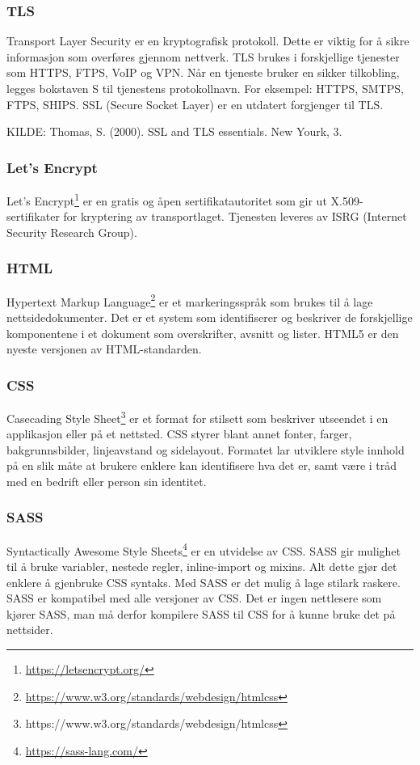 \subsubsection{TLS}
Transport Layer Security er en kryptografisk protokoll. Dette er viktig for å sikre informasjon som overføres gjennom nettverk. TLS brukes i forskjellige tjenester som HTTPS, FTPS, VoIP og VPN.
Når en tjeneste bruker en sikker tilkobling, legges bokstaven S til tjenestens protokollnavn. For eksempel: HTTPS, SMTPS, FTPS, SHIPS.
SSL (Secure Socket Layer) er en utdatert forgjenger til TLS.

KILDE: Thomas, S. (2000). SSL and TLS essentials. New Yourk, 3.

\subsubsection{Let’s Encrypt}
Let’s Encrypt\footnote{\url{https://letsencrypt.org/}} er en gratis og åpen sertifikatautoritet som gir ut X.509-sertifikater for kryptering av transportlaget. Tjenesten leveres av ISRG (Internet Security Research Group).

\subsubsection{HTML}
Hypertext Markup Language\footnote{\url{https://www.w3.org/standards/webdesign/htmlcss}} er et markeringsspråk som brukes til å lage nettsidedokumenter. Det er et system som identifiserer og beskriver de forskjellige komponentene i et dokument som overskrifter, avsnitt og lister. HTML5 er den nyeste versjonen av HTML-standarden.

\subsubsection{CSS}
Casecading Style Sheet\footnote{https://www.w3.org/standards/webdesign/htmlcss} er et format for stilsett som beskriver utseendet i en applikasjon eller på et nettsted. CSS styrer blant annet fonter, farger, bakgrunnsbilder, linjeavstand og sidelayout. Formatet lar utviklere style innhold på en slik måte at brukere enklere kan identifisere hva det er, samt være i tråd med en bedrift eller person sin identitet.

\subsubsection{SASS}
Syntactically Awesome Style Sheets\footnote{\url{https://sass-lang.com/}} er en utvidelse av CSS. SASS gir mulighet til å bruke variabler, nestede regler, inline-import og mixins. Alt dette gjør det enklere å gjenbruke CSS syntaks. Med SASS er det mulig å lage stilark raskere. SASS er kompatibel med alle versjoner av CSS. Det er ingen nettlesere som kjører SASS, man må derfor kompilere SASS til CSS for å kunne bruke det på nettsider.

